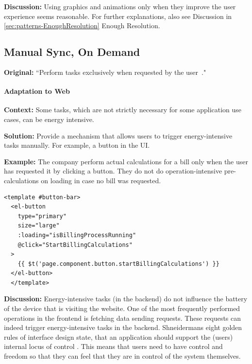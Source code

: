\textbf{Discussion:} Using graphics and animations only when they improve the user experience seems reasonable. For further explanations, also see Discussion in \ref{sec:patterns-EnoughResolution} Enough Resolution.


\subsection{Manual Sync, On Demand} \label{sec:patterns-ManualSyncOnDemand}
\textbf{Original:} ``Perform tasks exclusively when requested by the user~\cite{cruz2019catalog}."

\paragraph{Adaptation to Web}\mbox{}

\textbf{Context:} Some tasks, which are not strictly necessary for some application use cases, can be energy intensive.

\textbf{Solution:} Provide a mechanism that allows users to trigger energy-intensive tasks manually. For example, a button in the UI.

\textbf{Example:} The company perform actual calculations for a bill only when the user has requested it by clicking a button. They do not do operation-intensive pre-calculations on loading in case no bill was requested.

\begin{minipage}{0.95\linewidth}
    \begin{lstlisting}[caption={Implementation of a button which starts the billing process only when pressed.},label={manualsynchondemandcode}]
  <template #button-bar>
  <el-button
    type="primary"
    size="large"
    :loading="isBillingProcessRunning"
    @click="StartBillingCalculations"
  >
    {{ $t('page.component.button.startBillingCalculations') }}
  </el-button>
  </template>
  \end{lstlisting}
  \end{minipage}

\textbf{Discussion:} Energy-intensive tasks (in the backend) do not influence the battery of the device that is visiting the website. One of the most frequently performed operations in the frontend is fetching data \ie sending requests. These requests can indeed trigger energy-intensive tasks in the backend. Shneidermans eight golden rules of interface design state, that an application should support the (users) internal locus of control \cite{shneidermans-eight-golden-rules}. This means that users need to have control and freedom so that they can feel that they are in control of the system themselves.




